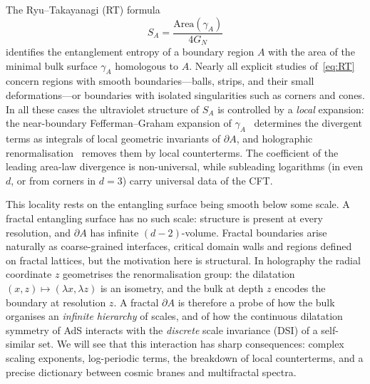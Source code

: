 \documentclass[11pt]{article}
\theoremstyle{definition}\newtheorem{definition}{Definition}[section]
\theoremstyle{remark}\newtheorem*{remark}{Remark}
\newcommand{\Area}{\mathrm{Area}}
\newcommand{\GN}{G_N}
\begin{document}
The Ryu--Takayanagi (RT) formula~\cite{RT}
\begin{equation}
S_A=\frac{\Area(\gamma_A)}{4\GN}
\label{eq:RT}
\end{equation}
identifies the entanglement entropy of a boundary region $A$ with the area of the minimal bulk surface
$\gamma_A$ homologous to $A$. Nearly all explicit studies of~\eqref{eq:RT} concern regions with smooth
boundaries---balls, strips, and their small deformations---or boundaries with isolated singularities such as
corners and cones. In all these cases the ultraviolet structure of $S_A$ is controlled by a \emph{local}
expansion: the near-boundary Fefferman--Graham expansion of $\gamma_A$~\cite{FG,GW} determines the
divergent terms as integrals of local geometric invariants of $\partial A$, and holographic
renormalisation~\cite{Skenderis} removes them by local counterterms. The coefficient of the leading area-law
divergence is non-universal, while subleading logarithms (in even $d$, or from corners in $d=3$) carry
universal data of the CFT.

This locality rests on the entangling surface being smooth below some scale. A fractal entangling surface
has no such scale: structure is present at every resolution, and $\partial A$ has infinite
$(d-2)$-volume. Fractal boundaries arise naturally as coarse-grained interfaces, critical domain walls and
regions defined on fractal lattices, but the motivation here is structural. In holography the radial
coordinate $z$ geometrises the renormalisation group: the dilatation $(x,z)\mapsto(\lambda x,\lambda z)$ is an
isometry, and the bulk at depth $z$ encodes the boundary at resolution $z$. A fractal $\partial A$ is
therefore a probe of how the bulk organises an \emph{infinite hierarchy} of scales, and of how the continuous
dilatation symmetry of AdS interacts with the \emph{discrete} scale invariance (DSI) of a self-similar set.
We will see that this interaction has sharp consequences: complex scaling exponents, log-periodic terms, the
breakdown of local counterterms, and a precise dictionary between cosmic branes and multifractal spectra.
\end{document}
